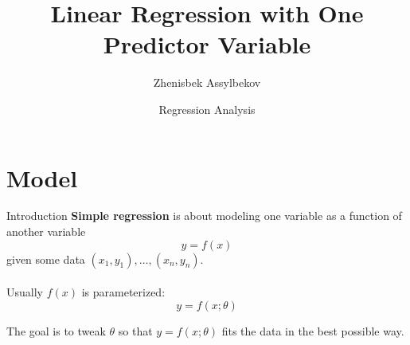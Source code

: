 \documentclass{beamer}
\title{Linear Regression with One Predictor Variable}
\author{Zhenisbek Assylbekov}
\institute{Department of Mathematics}
\date{Regression Analysis}
\begin{document}
\begin{frame}
  \titlepage
\end{frame}


\section{Model}

\begin{frame}{Introduction}
\textbf{Simple regression} is about modeling one variable  as a function of another variable
$$
y=f(x)
$$
given some data $(x_1, y_1), \ldots, (x_n, y_n)$.\\~\\

\pause Usually $f(x)$ is parameterized:
$$
y=f(x;\theta)
$$

\pause The goal is to tweak $\theta$ so that $y=f(x;\theta)$ fits the data in the best possible way.
\end{frame}
\end{document}
